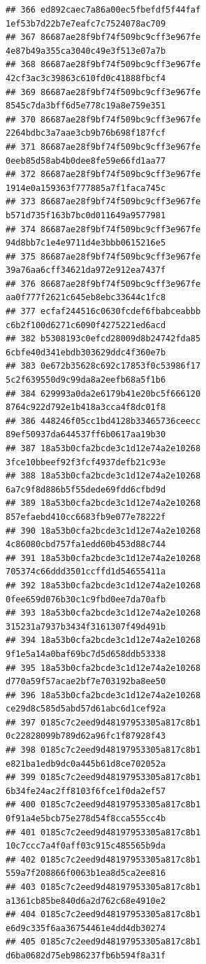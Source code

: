 \documentclass[]{article}
\begin{document}
\begin{verbatim}
## 366 ed892caec7a86a00ec5fbefdf5f44faf   1ef53b7d22b7e7eafc7c7524078ac709
## 367 86687ae28f9bf74f509bc9cff3e967fe   4e87b49a355ca3040c49e3f513e07a7b
## 368 86687ae28f9bf74f509bc9cff3e967fe   42cf3ac3c39863c610fd0c41888fbcf4
## 369 86687ae28f9bf74f509bc9cff3e967fe   8545c7da3bff6d5e778c19a8e759e351
## 370 86687ae28f9bf74f509bc9cff3e967fe   2264bdbc3a7aae3cb9b76b698f187fcf
## 371 86687ae28f9bf74f509bc9cff3e967fe   0eeb85d58ab4b0dee8fe59e66fd1aa77
## 372 86687ae28f9bf74f509bc9cff3e967fe   1914e0a159363f777885a7f1faca745c
## 373 86687ae28f9bf74f509bc9cff3e967fe   b571d735f163b7bc0d011649a9577981
## 374 86687ae28f9bf74f509bc9cff3e967fe   94d8bb7c1e4e9711d4e3bbb0615216e5
## 375 86687ae28f9bf74f509bc9cff3e967fe   39a76aa6cff34621da972e912ea7437f
## 376 86687ae28f9bf74f509bc9cff3e967fe   aa0f777f2621c645eb8ebc33644c1fc8
## 377 ecfaf244516c0630fcdef6fbabceabbb   c6b2f100d6271c6090f4275221ed6acd
## 382 b5308193c0efcd28009d8b24742fda85   6cbfe40d341ebdb303629ddc4f360e7b
## 383 0e672b35628c692c17853f0c53986f17   5c2f639550d9c99da8a2eefb68a5f1b6
## 384 629993a0da2e6179b41e20bc5f666120   8764c922d792e1b418a3cca4f8dc01f8
## 386 448246f05cc1bd4128b33465736ceecc   89ef50937da644537ff6b0617aa19b30
## 387 18a53b0cfa2bcde3c1d12e74a2e10268   3fce10bbeef92f3fcf4937defb21c93e
## 388 18a53b0cfa2bcde3c1d12e74a2e10268   6a7c9f8d886b5f55dede69fdd6cfbd9d
## 389 18a53b0cfa2bcde3c1d12e74a2e10268   857efaebd410cc6683fb9e077e78222f
## 390 18a53b0cfa2bcde3c1d12e74a2e10268   4c86080cbd757fa1edd60b453d88c744
## 391 18a53b0cfa2bcde3c1d12e74a2e10268   705374c66ddd3501ccffd1d54655411a
## 392 18a53b0cfa2bcde3c1d12e74a2e10268   0fee659d076b30c1c9fbd0ee7da70afb
## 393 18a53b0cfa2bcde3c1d12e74a2e10268   315231a7937b3434f3161307f49d491b
## 394 18a53b0cfa2bcde3c1d12e74a2e10268   9f1e5a14a0baf69bc7d5d658ddb53338
## 395 18a53b0cfa2bcde3c1d12e74a2e10268   d770a59f57acae2bf7e703192ba8ee50
## 396 18a53b0cfa2bcde3c1d12e74a2e10268   ce29d8c585d5abd57d61abc6d1cef92a
## 397 0185c7c2eed9d48197953305a817c8b1   0c22828099b789d62a96fc1f87928f43
## 398 0185c7c2eed9d48197953305a817c8b1   e821ba1edb9dc0a445b61d8ce702052a
## 399 0185c7c2eed9d48197953305a817c8b1   6b34fe24ac2ff8103f6fce1f0da2ef57
## 400 0185c7c2eed9d48197953305a817c8b1   0f91a4e5bcb75e278d54f8cca555cc4b
## 401 0185c7c2eed9d48197953305a817c8b1   10c7ccc7a4f0aff03c915c485565b9da
## 402 0185c7c2eed9d48197953305a817c8b1   559a7f208866f0063b1ea8d5ca2ee816
## 403 0185c7c2eed9d48197953305a817c8b1   a1361cb85be840d6a2d762c68e4910e2
## 404 0185c7c2eed9d48197953305a817c8b1   e6d9c335f6aa36754461e4dd4db30274
## 405 0185c7c2eed9d48197953305a817c8b1   d6ba0682d75eb986237fb6b594f8a31f

\end{verbatim}
\end{document}

